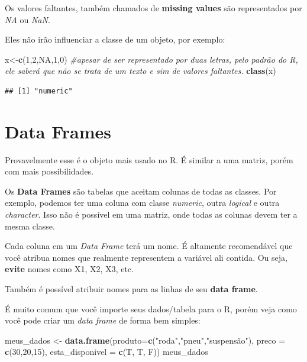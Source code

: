 \documentclass[
]{book}
\newenvironment{Shaded}{\begin{snugshade}}{\end{snugshade}}
\newcommand{\CommentTok}[1]{\textcolor[rgb]{0.56,0.35,0.01}{\textit{#1}}}
\newcommand{\DataTypeTok}[1]{\textcolor[rgb]{0.13,0.29,0.53}{#1}}
\newcommand{\DecValTok}[1]{\textcolor[rgb]{0.00,0.00,0.81}{#1}}
\newcommand{\KeywordTok}[1]{\textcolor[rgb]{0.13,0.29,0.53}{\textbf{#1}}}
\newcommand{\NormalTok}[1]{#1}
\newcommand{\OtherTok}[1]{\textcolor[rgb]{0.56,0.35,0.01}{#1}}
\newcommand{\StringTok}[1]{\textcolor[rgb]{0.31,0.60,0.02}{#1}}
\begin{document}
Os valores faltantes, também chamados de \textbf{missing values} são
representados por \emph{NA} ou \emph{NaN}.

Eles não irão influenciar a classe de um objeto, por exemplo:

\begin{Shaded}
\begin{Highlighting}[]
\NormalTok{x<-}\KeywordTok{c}\NormalTok{(}\DecValTok{1}\NormalTok{,}\DecValTok{2}\NormalTok{,}\OtherTok{NA}\NormalTok{,}\DecValTok{1}\NormalTok{,}\DecValTok{0}\NormalTok{) }\CommentTok{#apesar de ser representado por duas letras, pelo padrão do R, ele saberá que não se trata de um texto e sim de valores faltantes.}
\KeywordTok{class}\NormalTok{(x)}
\end{Highlighting}
\end{Shaded}

\begin{verbatim}
## [1] "numeric"
\end{verbatim}

\hypertarget{data-frames}{%
\section{Data Frames}\label{data-frames}}

Provavelmente esse é o objeto mais usado no R. É similar a uma matriz,
porém com mais possibilidades.

Os \textbf{Data Frames} são tabelas que aceitam colunas de todas as
classes. Por exemplo, podemos ter uma coluna com classe \emph{numeric},
outra \emph{logical} e outra \emph{character}. Isso não é possível em
uma matriz, onde todas as colunas devem ter a mesma classe.

Cada coluna em um \emph{Data Frame} terá um nome. É altamente
recomendável que você atribua nomes que realmente representem a variável
ali contida. Ou seja, \textbf{evite} nomes como X1, X2, X3, etc.

Também é possível atribuir nomes para as linhas de seu \textbf{data
frame}.

É muito comum que você importe seus dados/tabela para o R, porém veja
como você pode criar um \emph{data frame} de forma bem simples:

\begin{Shaded}
\begin{Highlighting}[]
\NormalTok{meus_dados <-}\StringTok{ }\KeywordTok{data.frame}\NormalTok{(}\DataTypeTok{produto=}\KeywordTok{c}\NormalTok{(}\StringTok{"roda"}\NormalTok{,}\StringTok{"pneu"}\NormalTok{,}\StringTok{"suspensão"}\NormalTok{), }\DataTypeTok{preco =} \KeywordTok{c}\NormalTok{(}\DecValTok{30}\NormalTok{,}\DecValTok{20}\NormalTok{,}\DecValTok{15}\NormalTok{), }\DataTypeTok{esta_disponivel =} \KeywordTok{c}\NormalTok{(T, T, F))}
\NormalTok{meus_dados}
\end{Highlighting}
\end{Shaded}
\end{document}
